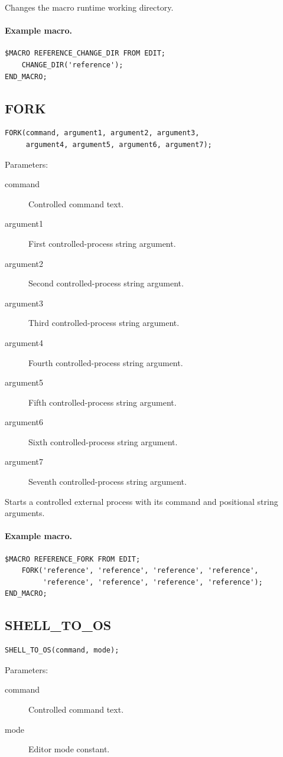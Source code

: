 \documentclass[a4paper,10pt,twoside,openany]{book}
\begin{document}
Changes the macro runtime working directory.

\paragraph{Example macro.}
\begin{verbatim}
$MACRO REFERENCE_CHANGE_DIR FROM EDIT;
    CHANGE_DIR('reference');
END_MACRO;
\end{verbatim}

\label{prim:procedure-fork}
\subsection*{FORK}
\begin{verbatim}
FORK(command, argument1, argument2, argument3,
     argument4, argument5, argument6, argument7);
\end{verbatim}
Parameters:
\begin{description}
\item[command] Controlled command text.
\item[argument1] First controlled-process string argument.
\item[argument2] Second controlled-process string argument.
\item[argument3] Third controlled-process string argument.
\item[argument4] Fourth controlled-process string argument.
\item[argument5] Fifth controlled-process string argument.
\item[argument6] Sixth controlled-process string argument.
\item[argument7] Seventh controlled-process string argument.
\end{description}

Starts a controlled external process with its command and positional string arguments.

\paragraph{Example macro.}
\begin{verbatim}
$MACRO REFERENCE_FORK FROM EDIT;
    FORK('reference', 'reference', 'reference', 'reference',
         'reference', 'reference', 'reference', 'reference');
END_MACRO;
\end{verbatim}

\label{prim:procedure-shell-to-os}
\subsection*{SHELL\_TO\_OS}
\begin{verbatim}
SHELL_TO_OS(command, mode);
\end{verbatim}
Parameters:
\begin{description}
\item[command] Controlled command text.
\item[mode] Editor mode constant.
\end{description}
\end{document}
